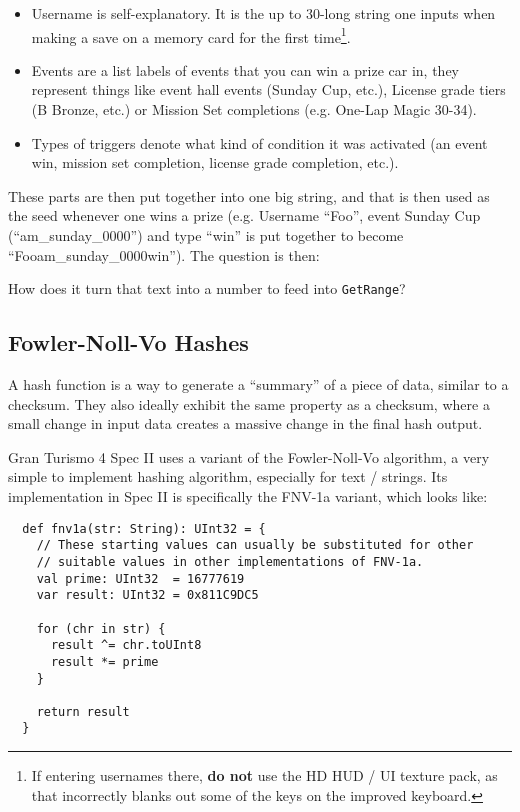 \documentclass[14pt,a4paper,notitlepage]{extarticle}
\begin{document}
        \begin{itemize}
            \item Username is self-explanatory. It is the up to 30-long string one inputs when
            making a save on a memory card for the first time\footnote{If entering usernames
            there, \textbf{do not} use the HD HUD / UI texture pack, as that incorrectly blanks
            out some of the keys on the improved keyboard.}.
            \item Events are a list labels of events that you can win a prize car in, they
            represent things like event hall events (Sunday Cup, etc.), License grade tiers (B
            Bronze, etc.) or Mission Set completions (e.g. One-Lap Magic 30-34).
            \item Types of triggers denote what kind of condition it was activated (an event
            win, mission set completion, license grade completion, etc.).
        \end{itemize}

        \noindent These parts are then put together into one big string, and that is then used
        as the seed whenever one wins a prize (e.g. Username ``Foo'', event Sunday Cup
        (``am\_sunday\_0000'') and type ``win'' is put together to become
        \\``Fooam\_sunday\_0000win''). The question is then:

        \begin{center}
            How does it turn that text into a number to feed into \texttt{GetRange}?
        \end{center}

        \subsection*{Fowler-Noll-Vo Hashes}
            A hash function is a way to generate a ``summary'' of a piece of data, similar to
            a checksum. They also ideally exhibit the same property as a checksum, where a
            small change in input data creates a massive change in the final hash output.

            Gran Turismo 4 Spec II uses a variant of the Fowler-Noll-Vo algorithm, a very simple
            to implement hashing algorithm, especially for text / strings. Its implementation
            in Spec II is specifically the FNV-1a variant, which looks like:
            \pagebreak
            \begin{lstlisting}
  def fnv1a(str: String): UInt32 = {
    // These starting values can usually be substituted for other
    // suitable values in other implementations of FNV-1a.
    val prime: UInt32  = 16777619
    var result: UInt32 = 0x811C9DC5

    for (chr in str) {
      result ^= chr.toUInt8
      result *= prime
    }

    return result
  }
            \end{lstlisting}
\end{document}
